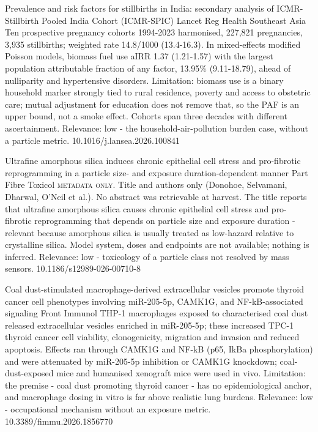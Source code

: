 \documentclass[10pt]{article}
\begin{document}
\par{}\baselineskip{}\baselineskip
{}

{Prevalence and risk factors for stillbirths in India: secondary analysis of ICMR-Stillbirth Pooled India Cohort (ICMR-SPIC)}
{Lancet Reg Health Southeast Asia}
{Ten prospective pregnancy cohorts 1994-2023 harmonised, 227,821 pregnancies, 3,935 stillbirths; weighted rate 14.8/1000 (13.4-16.3). In mixed-effects modified Poisson models, biomass fuel use aIRR 1.37 (1.21-1.57) with the largest population attributable fraction of any factor, 13.95\% (9.11-18.79), ahead of nulliparity and hypertensive disorders. Limitation: biomass use is a binary household marker strongly tied to rural residence, poverty and access to obstetric care; mutual adjustment for education does not remove that, so the PAF is an upper bound, not a smoke effect. Cohorts span three decades with different ascertainment. Relevance: low - the household-air-pollution burden case, without a particle metric.}
{10.1016/j.lansea.2026.100841}

\par{}\baselineskip{}\baselineskip
{}

{Ultrafine amorphous silica induces chronic epithelial cell stress and pro-fibrotic reprogramming in a particle size- and exposure duration-dependent manner}
{Part Fibre Toxicol}
{\textsc{metadata only.} Title and authors only (Donohoe, Selvamani, Dharwal, O'Neil et al.). No abstract was retrievable at harvest. The title reports that ultrafine amorphous silica causes chronic epithelial cell stress and pro-fibrotic reprogramming that depends on particle size and exposure duration - relevant because amorphous silica is usually treated as low-hazard relative to crystalline silica. Model system, doses and endpoints are not available; nothing is inferred. Relevance: low - toxicology of a particle class not resolved by mass sensors.}
{10.1186/s12989-026-00710-8}

{Coal dust-stimulated macrophage-derived extracellular vesicles promote thyroid cancer cell phenotypes involving miR-205-5p, CAMK1G, and NF-kB-associated signaling}
{Front Immunol}
{THP-1 macrophages exposed to characterised coal dust released extracellular vesicles enriched in miR-205-5p; these increased TPC-1 thyroid cancer cell viability, clonogenicity, migration and invasion and reduced apoptosis. Effects ran through CAMK1G and NF-kB (p65, IkBa phosphorylation) and were attenuated by miR-205-5p inhibition or CAMK1G knockdown; coal-dust-exposed mice and humanised xenograft mice were used in vivo. Limitation: the premise - coal dust promoting thyroid cancer - has no epidemiological anchor, and macrophage dosing in vitro is far above realistic lung burdens. Relevance: low - occupational mechanism without an exposure metric.}
{10.3389/fimmu.2026.1856770}
\end{document}
